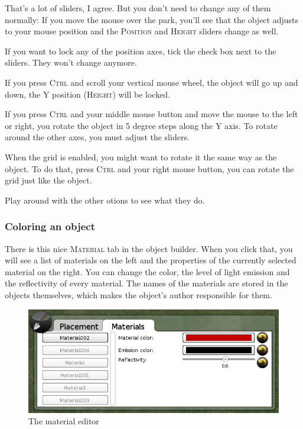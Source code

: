\documentclass[a4paper]{article}
\newcommand{\ccaption}[1]{\textsc{#1}}
\begin{document}
That's a lot of sliders, I agree. But you don't need to change any of them normally: If you move the mouse over the park, you'll see that the
object adjusts to your mouse position and the \ccaption{Position} and \ccaption{Height} sliders change as well.

If you want to lock any of the position axes, tick the check box next to the sliders. They won't change anymore.

If you press \ccaption{Ctrl} and scroll your vertical mouse wheel, the object will go up and down, the Y position (\ccaption{Height}) will
be locked.

If you press \ccaption{Ctrl} and your middle mouse button and move the mouse to the left or right, you rotate the object in 5 degree
steps along the Y axis. To rotate around the other axes, you must adjust the sliders.

When the grid is enabled, you might want to rotate it the same way as the object. To do that, press \ccaption{Ctrl} and your right mouse
button, you can rotate the grid just like the object.

Play around with the other otions to see what they do.

\subsubsection{Coloring an object}
There is this nice \ccaption{Material} tab in the object builder. When you click that, you will see a list of materials on the left and the
properties of the currently selected material on the right. You can change the color, the level of light emission and the reflectivity
of every material. The names of the materials are stored in the objects themselves, which makes the object's author responsible for them.

\begin{figure}[h]
  \begin{center}
    \includegraphics[width=120mm]{./images/objectmaterials.png}
  \end{center}
  \caption{The material editor}
\end{figure}
\end{document}
